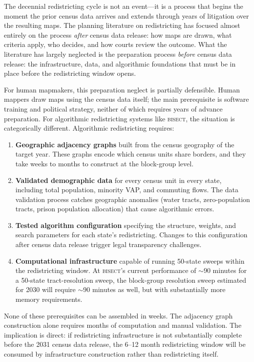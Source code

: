 \label{sec:introduction}

The decennial redistricting cycle is not an event---it is a process that begins
the moment the prior census data arrives and extends through years of litigation
over the resulting maps. The planning literature on redistricting has focused
almost entirely on the process \textit{after} census data release: how maps are
drawn, what criteria apply, who decides, and how courts review the outcome.
What the literature has largely neglected is the preparation process \textit{before}
census data release: the infrastructure, data, and algorithmic foundations that
must be in place before the redistricting window opens.

For human mapmakers, this preparation neglect is partially defensible. Human mappers
draw maps using the census data itself; the main prerequisite is software training
and political strategy, neither of which requires years of advance preparation.
For algorithmic redistricting systems like \textsc{bisect}, the situation is categorically
different. Algorithmic redistricting requires:

\begin{enumerate}
\item \textbf{Geographic adjacency graphs} built from the census geography of the
  target year. These graphs encode which census units share borders, and they take
  weeks to months to construct at the block-group level.
\item \textbf{Validated demographic data} for every census unit in every state,
  including total population, minority VAP, and commuting flows. The data validation
  process catches geographic anomalies (water tracts, zero-population tracts,
  prison population allocation) that cause algorithmic errors.
\item \textbf{Tested algorithm configuration} specifying the structure, weights,
  and search parameters for each state's redistricting. Changes to this configuration
  after census data release trigger legal transparency challenges.
\item \textbf{Computational infrastructure} capable of running 50-state sweeps within
  the redistricting window. At \textsc{bisect}'s current performance of $\sim$90 minutes
  for a 50-state tract-resolution sweep, the block-group resolution sweep estimated
  for 2030 will require $\sim$90 minutes as well, but with substantially more
  memory requirements.
\end{enumerate}

None of these prerequisites can be assembled in weeks. The adjacency graph construction
alone requires months of computation and manual validation. The implication is direct:
if redistricting infrastructure is not substantially complete before the 2031 census
data release, the 6--12 month redistricting window will be consumed by infrastructure
construction rather than redistricting itself.

